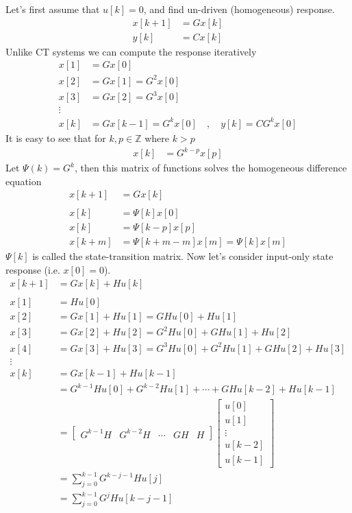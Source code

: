 \documentclass[twoside]{article}
\begin{document}
Let's first assume that $u[k] = 0$, and find un-driven (homogeneous)
response.
%
\begin{align*}
  x[k+1] &= G x[k] \\
  y[k] &= C x[k]
\end{align*}
%
Unlike CT systems we can compute the response iteratively
%
\begin{align*}
  x[1] &= G x[0] 
  \\
  x[2] &= G x[1] = G^2 x[0] 
  \\
  x[3] &= G x[2] = G^3 x[0] 
  \\
  \vdots
  \\
  x[k] &= G x[k-1] = G^k x[0] \quad , \quad y[k] = C G^k x[0]
\end{align*}
%
It is easy to see that for $k , p \in \mathbb{Z}$ where $k > p$
%
\begin{align*}
  x[k] &= G^{k-p} x[p] 
\end{align*}
%
Let $\Psi(k) = G^k$, then this matrix of functions solves the
homogeneous difference equation
%
\begin{align*}
  x[k+1] &= G x[k] 
\\    
\\
  x[k] &=\Psi[k] x[0] 
\\
  x[k] &=\Psi[k-p] x[p] 
\\
 x[k+m] &=\Psi[ k + m - m] x[m] = \Psi[k] x[m]
\end{align*}
%
$\Psi[k]$ is called the state-transition matrix.
%
Now let's consider input-only state response (i.e. $x[0] = 0$).
%
\begin{align*}
  x[k+1] &= G x[k] + H u[k] 
  \\
  \\
  x[1] &= H u[0]
  \\
  x[2] &= G x[1] + H u[1] = G H u[0] + H u[1] 
  \\
  x[3] &= G x[2] + H u[2] = G^2 H u[0] + G H u[1] + H u[2]
  \\
  x[4] &= G x[3] + H u[3] = G^3 H u[0] + G^2 H u[1] + G H u[2] + H
         u[3]
  \\
  \vdots
 \\
  x[k] &= G x[k-1] + H u[k-1] \\
         &= G^{k-1} H u[0] + G^{k-2} H u[1] +
         \cdots + G H u[k-2] + H u[k-1]
         \\
         &= \left[ \begin{array}{c|c|c|c|c} G^{k-1} H & G^{k-2} H &
         \cdots & G H & H \end{array} \right]
         \left[ \begin{array}{c}
                  u[0] \\ u[1] \\ \vdots \\ u[k-2] \\ u[k-1]
         \end{array} \right]
         \\
         &= \sum\limits_{j = 0}^{k-1} G^{k-j-1} H u[j]
         \\
         &= \sum\limits_{j = 0}^{k-1} G^{j} H u[k-j-1]
\end{align*}
\end{document}
